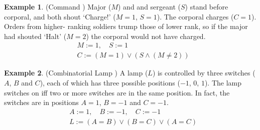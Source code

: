 \documentclass[11pt,a4paper]{book}
\theoremstyle{definition}
\theoremstyle{definition}
\newtheorem{example}{Example}[section]
\theoremstyle{definition}
\theoremstyle{remark}
\begin{document}
\begin{example}(Command  \cite{Weslake2015partialtheory})
Major ($M$) and and sergeant ($S$) stand before corporal, and both shout ‘Charge!’ ($M=1$, $S=1$). The corporal charges ($C=1$). Orders from higher- ranking soldiers trump those of lower rank, so if the major had shouted ‘Halt’ ($M=2$) the corporal would not have charged.
\begin{equation*}
\begin{split}
&M:=1, \quad S:=1\\
& C:= (M=1) \lor (S\land (M \neq 2))
\end{split}
\end{equation*}
\begin{center}
\end{center}
\end{example}


\begin{example}(Combinatorial Lamp  \cite{Weslake2015partialtheory})
A lamp ($L$) is controlled by three switches ($A$, $B$ and $C$), each of which has three possible positions ($-1$, $0$, $1$). The lamp switches on iff two or more switches are in the same position. In fact, the switches are in positions $A=1$, $B=-1$ and $C=-1$.
\begin{equation*}
\begin{split}
&A:=1, \quad B:=-1, \quad C:=-1\\
& L:= (A=B) \lor (B=C) \lor (A=C)
\end{split}
\end{equation*}
\begin{center}
\end{center}
\end{example}
\end{document}
